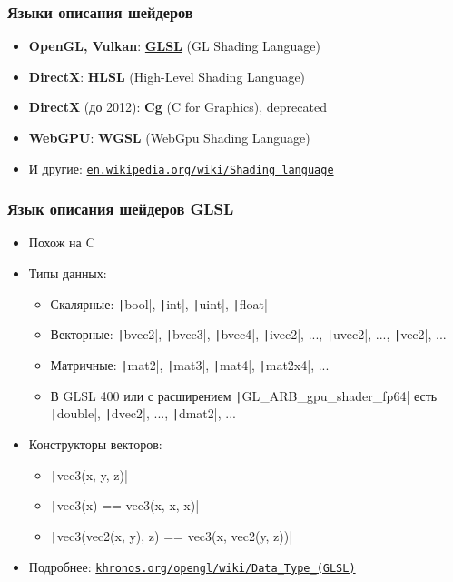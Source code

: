 \documentclass[10pt]{beamer}
\begin{document}
\begin{frame}[fragile]
\frametitle{Языки описания шейдеров}
\begin{itemize}
\item \textbf{OpenGL, Vulkan}: \textbf{\alert{\underline{GLSL}}} (GL Shading Language)
\pause
\item \textbf{DirectX}: \textbf{HLSL} (High-Level Shading Language)
\pause
\item \textbf{DirectX} (до 2012): \textbf{Cg} (C for Graphics), deprecated
\pause
\item \textbf{WebGPU}: \textbf{WGSL} (WebGpu Shading Language)
\pause
\item И другие: \href{https://en.wikipedia.org/wiki/Shading_language}{\nolinkurl{en.wikipedia.org/wiki/Shading\_language}}
\end{itemize}
\end{frame}

\begin{frame}[fragile]
\frametitle{Язык описания шейдеров GLSL}
\begin{itemize}
\item Похож на C
\pause
\item Типы данных:
\pause
\begin{itemize}
\item Скалярные: \texttt|bool|, \texttt|int|, \texttt|uint|, \texttt|float|
\pause
\item Векторные: \texttt|bvec2|, \texttt|bvec3|, \texttt|bvec4|, \texttt|ivec2|, ..., \texttt|uvec2|, ..., \texttt|vec2|, ...
\pause
\item Матричные: \texttt|mat2|, \texttt|mat3|, \texttt|mat4|, \texttt|mat2x4|, ...
\pause
\item В GLSL 400 или с расширением \texttt|GL_ARB_gpu_shader_fp64| есть \texttt|double|, \texttt|dvec2|, ..., \texttt|dmat2|, ...
\end{itemize}
\pause
\item Конструкторы векторов:
\pause
\begin{itemize}
\item \texttt|vec3(x, y, z)|
\pause
\item \texttt|vec3(x) == vec3(x, x, x)|
\pause
\item \texttt|vec3(vec2(x, y), z) == vec3(x, vec2(y, z))|
\end{itemize}
\pause
\item Подробнее: \href{https://www.khronos.org/opengl/wiki/Data_Type_(GLSL)}{\nolinkurl{khronos.org/opengl/wiki/Data\_Type\_(GLSL)}}
\end{itemize}
\end{frame}
\end{document}
